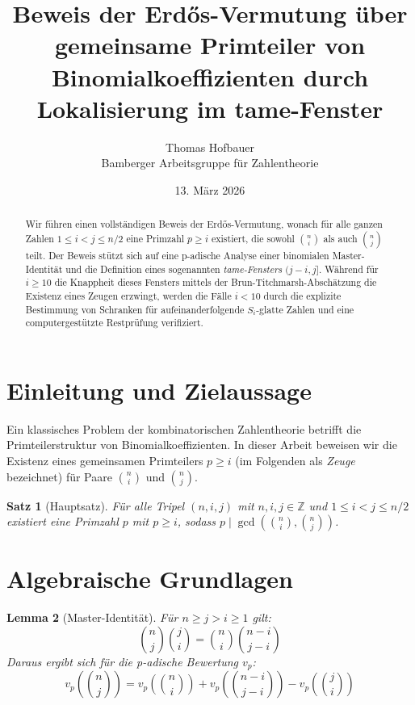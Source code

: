 \documentclass[12pt,a4paper]{article}
\title{Beweis der Erdős-Vermutung über gemeinsame Primteiler von Binomialkoeffizienten durch Lokalisierung im tame-Fenster}
\author{Thomas Hofbauer \\ \small{Bamberger Arbeitsgruppe für Zahlentheorie}}
\date{13. März 2026}
\newtheorem{theorem}{Satz}[section]
\newtheorem{lemma}[theorem]{Lemma}
\begin{document}
	
	\maketitle
	
	\begin{abstract}
		Wir führen einen vollständigen Beweis der Erdős-Vermutung, wonach für alle ganzen Zahlen $1 \le i < j \le n/2$ eine Primzahl $p \ge i$ existiert, die sowohl $\binom{n}{i}$ als auch $\binom{n}{j}$ teilt. Der Beweis stützt sich auf eine p-adische Analyse einer binomialen Master-Identität und die Definition eines sogenannten \textit{tame-Fensters} $(j-i, j]$. Während für $i \ge 10$ die Knappheit dieses Fensters mittels der Brun-Titchmarsh-Abschätzung die Existenz eines Zeugen erzwingt, werden die Fälle $i < 10$ durch die explizite Bestimmung von Schranken für aufeinanderfolgende $S_i$-glatte Zahlen und eine computergestützte Restprüfung verifiziert.
	\end{abstract}
	
	\section{Einleitung und Zielaussage}
	Ein klassisches Problem der kombinatorischen Zahlentheorie betrifft die Primteilerstruktur von Binomialkoeffizienten. In dieser Arbeit beweisen wir die Existenz eines gemeinsamen Primteilers $p \ge i$ (im Folgenden als \textit{Zeuge} bezeichnet) für Paare $\binom{n}{i}$ und $\binom{n}{j}$.
	
	\begin{theorem}[Hauptsatz]
		Für alle Tripel $(n, i, j)$ mit $n, i, j \in \mathbb{Z}$ und $1 \le i < j \le n/2$ existiert eine Primzahl $p$ mit $p \ge i$, sodass $p \mid \gcd\left(\binom{n}{i}, \binom{n}{j}\right)$.
	\end{theorem}
	
	\section{Algebraische Grundlagen}
	
	\begin{lemma}[Master-Identität]
		Für $n \ge j > i \ge 1$ gilt:
		\begin{equation}
			\binom{n}{j}\binom{j}{i} = \binom{n}{i}\binom{n-i}{j-i}
		\end{equation}
		Daraus ergibt sich für die p-adische Bewertung $v_p$:
		\begin{equation}
			v_p\left(\binom{n}{j}\right) = v_p\left(\binom{n}{i}\right) + v_p\left(\binom{n-i}{j-i}\right) - v_p\left(\binom{j}{i}\right)
		\end{equation}
	\end{lemma}
	
\end{document}
